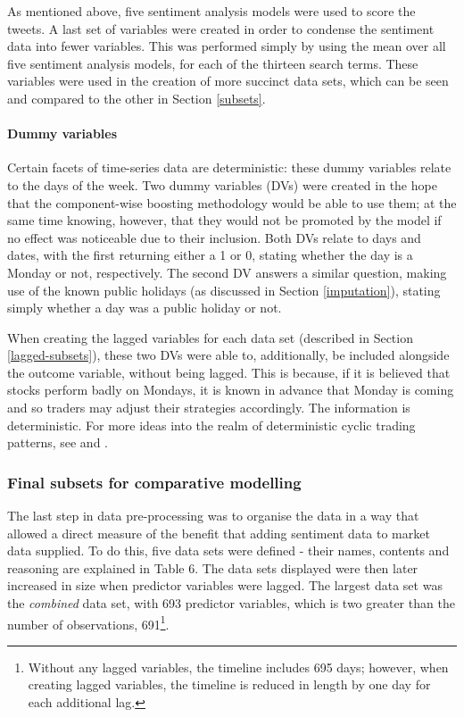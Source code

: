 \documentclass{article}
\begin{document}
As mentioned above, five sentiment analysis models were used to score the tweets. A last set of variables were created in order to condense the sentiment data into fewer variables. This was performed simply by using the mean over all five sentiment analysis models, for each of the thirteen search terms. These variables were used in the creation of more succinct data sets, which can be seen and compared to the other in Section \ref{subsets}.


\paragraph{Dummy variables \label{dummy-vars}}
\label{sec-1-2-3-3}

Certain facets of time-series data are deterministic: these dummy variables relate to the days of the week. Two dummy variables (DVs) were created in the hope that the component-wise boosting methodology would be able to use them; at the same time knowing, however, that they would not be promoted by the model if no effect was noticeable due to their inclusion. Both DVs relate to days and dates, with the first returning either a 1 or 0, stating whether the day is a Monday or not, respectively. The second DV answers a similar question, making use of the known public holidays (as discussed in Section \ref{imputation}), stating simply whether a day was a public holiday or not.

When creating the lagged variables for each data set (described in Section \ref{lagged-subsets}), these two DVs were able to, additionally, be included alongside the outcome variable, without being lagged. This is because, if it is believed that stocks perform badly on Mondays, it is known in advance that Monday is coming and so traders may adjust their strategies accordingly. The information is deterministic. For more ideas into the realm of deterministic cyclic trading patterns, see \cite{gondhalekar2003blue} and \cite{kamstra2003winter}.


\subsubsection{Final subsets for comparative modelling \label{subsets}}
\label{sec-1-2-4}

The last step in data pre-processing was to organise the data in a way that allowed a direct measure of the benefit that adding sentiment data to market data supplied. To do this, five data sets were defined - their names, contents and reasoning are explained in Table 6. The data sets displayed were then later increased in size when predictor variables were lagged. The largest data set was the \emph{combined} data set, with 693 predictor variables, which is two greater than the number of observations, 691\footnote{Without any lagged variables, the timeline includes 695 days; however, when creating lagged variables, the timeline is reduced in length by one day for each additional lag.}.
\end{document}
